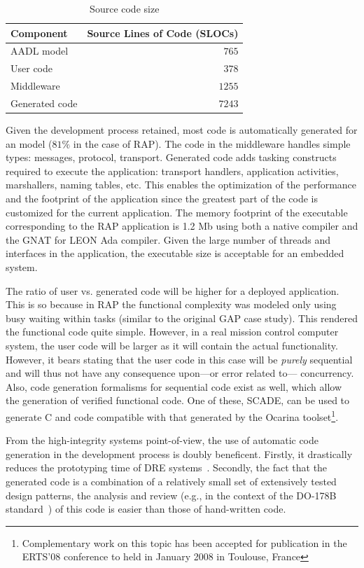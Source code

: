 \begin{table}
\centering
\begin{tabular}{|l|r|}
\hline
\textbf{Component} & \textbf{Source Lines of Code (SLOCs)}\\
\hline
AADL model         & $765$\\
User code          & $378$\\
Middleware         & $1255$\\
Generated code     & $7243$\\
\hline
\end{tabular}
\caption{Source code size}
\label{SLOCs}
\end{table}

Given the development process retained, most code is automatically
generated for an \aadl{} model ($81\%$ in the case of RAP). The code
in the middleware handles simple types: messages, protocol,
transport. Generated code adds tasking constructs required to execute
the application: transport handlers, application activities,
marshallers, naming tables, etc. This enables the optimization of the
performance and the footprint of the application since the greatest
part of the code is customized for the current application. The memory
footprint of the executable corresponding to the RAP application is
1.2 Mb using both a native \ada compiler and the GNAT for LEON Ada
compiler. Given the large number of threads and interfaces in the
application, the executable size is acceptable for an embedded system.

The ratio of user vs. generated code will be higher for a deployed
application. This is so because in RAP the functional complexity was
modeled only using busy waiting within tasks (similar to the original
GAP case study). This rendered the functional code quite
simple. However, in a real mission control computer system, the user
code will be larger as it will contain the actual
functionality. However, it bears stating that the user code in this
case will be \emph{purely} sequential and will thus not have any
consequence upon---or error related to--- concurrency. Also, code
generation formalisms for sequential code exist as well, which allow
the generation of verified functional code. One of these, SCADE, can
be used to generate C and \ada code compatible with that generated by
the Ocarina toolset\footnote{Complementary work on this topic has been
  accepted for publication in the ERTS'08 conference to held in
  January 2008 in Toulouse, France}.

From the high-integrity systems point-of-view, the use of automatic
code generation in the development process is doubly
beneficent. Firstly, it drastically reduces the prototyping time of
DRE systems~\cite{hugues@rsp07}. Secondly, the fact that the generated
code is a combination of a relatively small set of extensively tested
design patterns, the analysis and review (e.g., in the context of the
DO-178B standard~\cite{do178b}) of this code is easier than those of
hand-written code.

